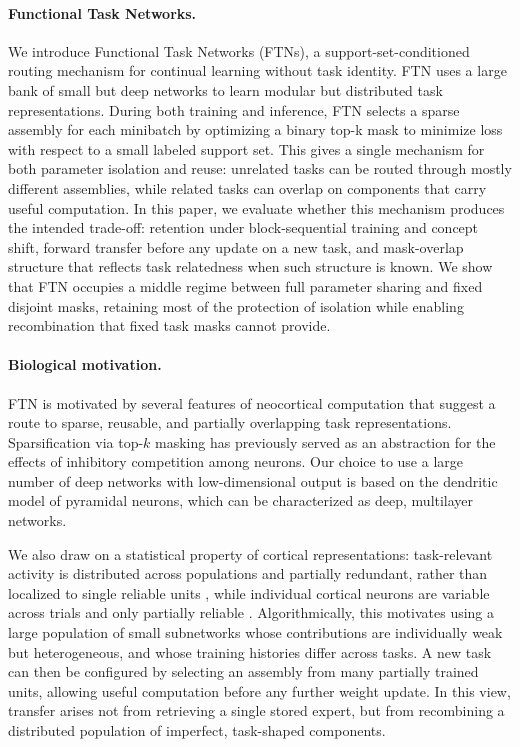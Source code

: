 \documentclass{article}
\begin{document}
\paragraph{Functional Task Networks.}
We introduce Functional Task Networks (FTNs), a support-set-conditioned routing mechanism for continual learning without task identity. FTN uses a large bank of small but deep networks to learn modular but distributed task representations. During both training and inference, FTN selects a sparse assembly for each minibatch by optimizing a binary top-k mask to minimize loss with respect to a small labeled support set. This gives a single mechanism for both parameter isolation and reuse: unrelated tasks can be routed through mostly different assemblies, while related tasks can overlap on components that carry useful computation. In this paper, we evaluate whether this mechanism produces the intended trade-off: retention under block-sequential training and concept shift, forward transfer before any update on a new task, and mask-overlap structure that reflects task relatedness when such structure is known. We show that FTN occupies a middle regime between full parameter sharing and fixed disjoint masks, retaining most of the protection of isolation while enabling recombination that fixed task masks cannot provide.

\paragraph{Biological motivation.}
FTN is motivated by several features of neocortical computation that suggest a route to sparse, reusable, and partially overlapping task representations. Sparsification via top-$k$ masking has previously served as an abstraction for the effects of inhibitory competition among neurons\citep{yang2019task,cichon2015branch,mongillo2018inhibitory,rolls2010attractor,khona2022attractor,amari1977dynamics,maass2000computational,douglas2004neuronal}. Our choice to use a large number of deep networks with low-dimensional output is based on the dendritic model of pyramidal neurons, which can be characterized as deep, multilayer networks\citep{poirazi2003pyramidal,poirazi2020illuminating,beniaguev2021single}. 

We also draw on a statistical property of cortical representations: task-relevant activity is distributed across populations and partially redundant, rather than localized to single reliable units \citep{georgopoulos1986neuronal,averbeck2006neural,cohen2011measuring}, while individual cortical neurons are variable across trials and only partially reliable \citep{tolhurst1983statistical,softky1993highly,shadlen1998variable,faisal2008noise,churchland2010stimulus,goris2014partitioning}. Algorithmically, this motivates using a large population of small subnetworks whose contributions are individually weak but heterogeneous, and whose training histories differ across tasks. A new task can then be configured by selecting an assembly from many partially trained units, allowing useful computation before any further weight update. In this view, transfer arises not from retrieving a single stored expert, but from recombining a distributed population of imperfect, task-shaped components.
\end{document}
